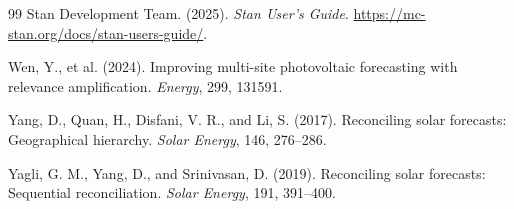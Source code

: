 \documentclass[11pt,a4paper]{article}
\begin{document}
\begin{thebibliography}{99}
Stan Development Team. (2025).
\newblock \emph{Stan User's Guide}.
\newblock \url{https://mc-stan.org/docs/stan-users-guide/}.

Wen, Y., et al. (2024).
\newblock Improving multi-site photovoltaic forecasting with relevance amplification.
\newblock \emph{Energy}, 299, 131591.

Yang, D., Quan, H., Disfani, V. R., and Li, S. (2017).
\newblock Reconciling solar forecasts: Geographical hierarchy.
\newblock \emph{Solar Energy}, 146, 276--286.

Yagli, G. M., Yang, D., and Srinivasan, D. (2019).
\newblock Reconciling solar forecasts: Sequential reconciliation.
\newblock \emph{Solar Energy}, 191, 391--400.

\end{thebibliography}
\end{document}
